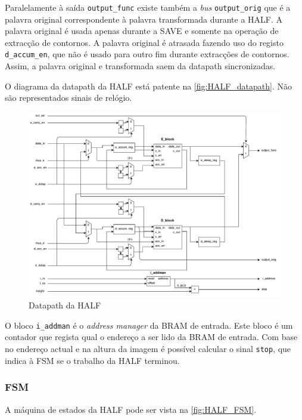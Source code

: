 \documentclass[a4paper]{article}
\begin{document}
Paralelamente à saída \texttt{output\_func} existe também a \textit{bus} \texttt{output\_orig} que é a palavra original correspondente à palavra transformada durante a HALF. A palavra original é usada apenas durante a SAVE e somente na operação de extracção de contornos. A palavra original é atrasada fazendo uso do registo \texttt{d\_accum\_en}, que não é usado para outro fim durante extracções de contornos. Assim, a palavra original e transformada saem da datapath sincronizadas.

O diagrama da datapath da HALF está patente na \autoref{fig:HALF_datapath}. Não são representados sinais de relógio.

\begin{figure}[H]
	\centerline{
		\includegraphics[width=.95\paperwidth]{HALF_datapath}
	}
	\caption{Datapath da HALF}
	\label{fig:HALF_datapath}
\end{figure}

O bloco \texttt{i\_addman} é o \textit{address manager} da BRAM de entrada. Este bloco é um contador que regista qual o endereço a ser lido da BRAM de entrada. Com base no endereço actual e na altura da imagem é possível calcular o sinal \texttt{stop}, que indica à FSM se o trabalho da HALF terminou.

\subsubsection{FSM}
A máquina de estados da HALF pode ser vista na \autoref{fig:HALF_FSM}.
\end{document}
